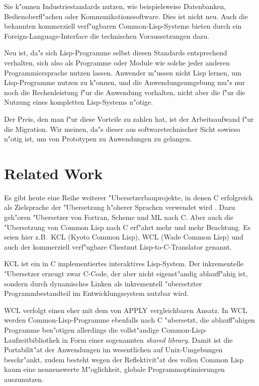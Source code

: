 Sie k"onnen Industriestandards nutzen, wie beispielsweise Datenbanken,
Bedienoberfl"achen oder Kommunikationssoftware. Dies ist nicht neu.
Auch die bekannten kommerziell verf"ugbaren Common-Lisp-Systeme bieten
durch ein Foreign-Language-Interface die technischen Voraussetzungen
dazu.

Neu ist, da"s sich Lisp-Programme selbst diesen Standards entsprechend
verhalten, sich also als Programme oder Module wie solche jeder
anderen Programmiersprache nutzen lassen. Anwender m"ussen nicht Lisp
lernen, um Lisp-Programme nutzen zu k"onnen, und die
Anwendungsumgebung mu"s nur noch die Rechenleistung f"ur die
Anwendung vorhalten, nicht aber die f"ur die Nutzung eines kompletten
Lisp-Systems n"otige.

Der Preis, den man f"ur diese Vorteile zu zahlen hat, ist der
Arbeitsaufwand f"ur die Migration. Wir meinen, da"s dieser aus
softwaretechnischer Sicht sowieso n"otig ist, um von Prototypen zu
Anwendungen zu gelangen.

\section{Related Work}

Es gibt heute eine Reihe weiterer "Ubersetzerbauprojekte, in denen C
erfolgreich als Zielsprache der "Ubersetzung h"oherer Sprachen
verwendet wird \cite{APPLY/CAU/IV.4/1}.  Dazu geh"oren "Ubersetzer von
Fortran, Scheme und ML nach C. Aber auch die "Ubersetzung von Common
Lisp nach C erf"ahrt mehr und mehr Beachtung. Es seien hier z.B.\ KCL
(Kyoto Common Lisp), WCL (Wade Common Lisp) und auch der kommerziell
verf"ugbare Chestnut Lisp-to-C-Translator genannt.

KCL \cite{kcl86} ist ein in C implementiertes interaktives
Lisp-System. Der inkrementelle "Ubersetzer erzeugt zwar C-Code, der
aber nicht eigenst"andig ablauf\/f"ahig ist, sondern durch dynamisches
Linken als inkrementell "ubersetzter Programmbestandteil im
Entwicklungssystem nutzbar wird.

WCL \cite{Hennessey92} verfolgt einen eher mit dem von APPLY
vergleichbaren Ansatz. In WCL werden Common-Lisp-Programme ebenfalls
nach C "ubersetzt, die ablauf\/f"ahigen Programme ben"otigen allerdings
die vollst"andige Common-Lisp-Laufzeitbibliothek in Form einer
sogenannten {\em shared library}. Damit ist die Portabilit"at der
Anwendungen im wesentlichen auf Unix-Umgebungen beschr"ankt, zudem
besteht wegen der Reflektivit"at des vollen Common Lisp kaum eine
nennenswerte M"oglichkeit, globale Programmoptimierungen auszunutzen.

